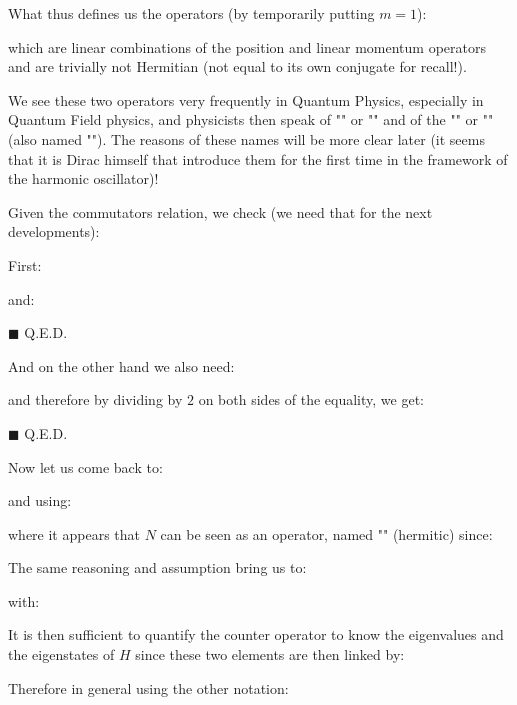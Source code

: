 	What thus defines us the operators (by temporarily putting $m=1$):
	
	which are linear combinations of the position and linear momentum operators and are trivially not Hermitian (not equal to its own conjugate for recall!).
	
	We see these two operators very frequently in Quantum Physics, especially in Quantum Field physics, and physicists then speak of "" or "" and of the "" or "" (also named ""). The reasons of these names will be more clear later (it seems that it is Dirac himself that introduce them for the first time in the framework of the harmonic oscillator)!

	Given the commutators relation, we check (we need that for the next developments):
	
	\begin{dem}
	First:
	
	and:
	
	\begin{flushright}
		$\blacksquare$  Q.E.D.
	\end{flushright}
	\end{dem}
	And on the other hand we also need:
	
	\begin{dem}
	
	and therefore by dividing by $2$ on both sides of the equality, we get:
	
	\begin{flushright}
		$\blacksquare$  Q.E.D.
	\end{flushright}
	\end{dem}
	Now let us come back to:
	
	and using:
	
	where it appears that $N$ can be seen as an operator, named "" (hermitic) since:
	
	The same reasoning and assumption bring us to:
	
	with:
	
	It is then sufficient to quantify the counter operator to know the eigenvalues and the eigenstates of $H$ since these two elements are then linked by:
	
	Therefore in general using the other notation:
	
